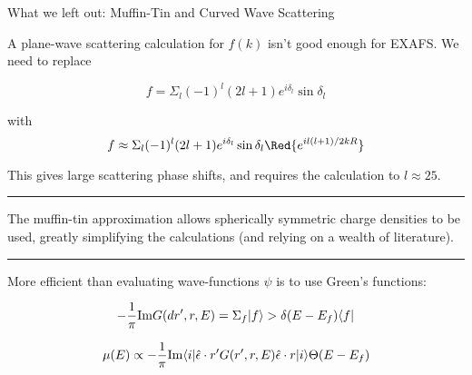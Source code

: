 \begin{slide}{What we left out: Muffin-Tin and Curved Wave Scattering}

    \vmm
    
    {}

    A plane-wave scattering calculation for $f(k)$ isn't good enough for
    EXAFS.     We need to replace 

    \[ f = \Sigma_l (-1)^l (2l+1) e^{i\delta_l} \sin\delta_l \]

    with 
    \[ f \approx \Sigma_l (-1)^l (2l+1) e^{i\delta_l} \sin\delta_l \Red{ e^{il(l+1)/2kR} } \] 
    
  
    This gives large scattering phase shifts, and requires the calculation
    to $l\approx 25$. 

    \vmm  \hrule \vmm

    {}

    The muffin-tin approximation allows spherically symmetric charge
    densities to be used, greatly simplifying the calculations (and relying
    on a wealth of literature).  
  
    \vmm  \hrule \vmm

    {}

    More efficient than evaluating wave-functions $\psi$ is to use Green's
    functions:
    
    \[ -{\frac{1}{\pi}}{\rm Im} G(dr',r,E) = \Sigma_f | f \rangle>\delta(E-E_f) \langle f| \]

    \[ {  \mu(E) \propto -{\frac{1}{\pi}}{\rm Im} \langle i | 
      \hat\epsilon\cdot{r'} G({r'},{r},E) \hat\epsilon\cdot {r} |
      i \rangle \Theta(E-E_f)  } 
    \] 


\end{slide} 
